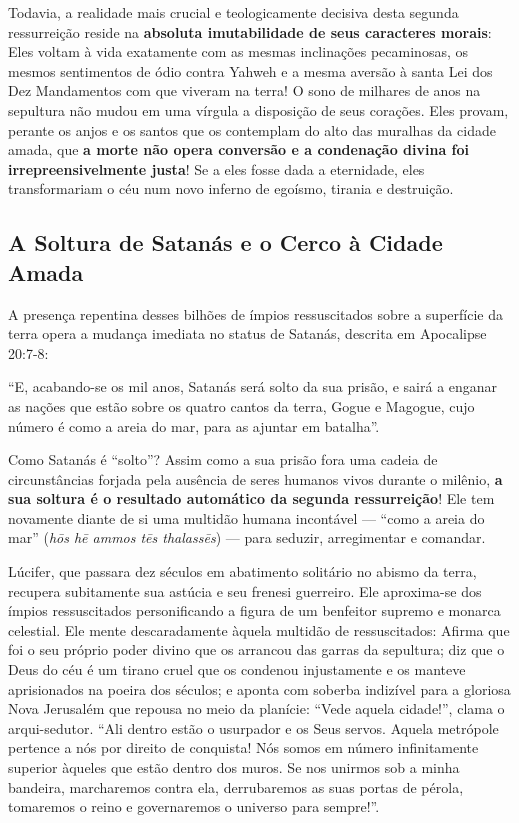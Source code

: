 \documentclass[11pt,a4paper,openany]{book}
\begin{document}
Todavia, a realidade mais crucial e teologicamente decisiva desta segunda ressurreição reside na \textbf{absoluta imutabilidade de seus caracteres morais}:
Eles voltam à vida exatamente com as mesmas inclinações pecaminosas, os mesmos sentimentos de ódio contra Yahweh e a mesma aversão à santa Lei dos Dez Mandamentos com que viveram na terra!
O sono de milhares de anos na sepultura não mudou em uma vírgula a disposição de seus corações. Eles provam, perante os anjos e os santos que os contemplam do alto das muralhas da cidade amada, que \textbf{a morte não opera conversão e a condenação divina foi irrepreensivelmente justa}! Se a eles fosse dada a eternidade, eles transformariam o céu num novo inferno de egoísmo, tirania e destruição.



\subsection{A Soltura de Satanás e o Cerco à Cidade Amada}


A presença repentina desses bilhões de ímpios ressuscitados sobre a superfície da terra opera a mudança imediata no status de Satanás, descrita em Apocalipse 20:7-8:

``E, acabando-se os mil anos, Satanás será solto da sua prisão, e sairá a enganar as nações que estão sobre os quatro cantos da terra, Gogue e Magogue, cujo número é como a areia do mar, para as ajuntar em batalha''.

Como Satanás é ``solto''?
Assim como a sua prisão fora uma cadeia de circunstâncias forjada pela ausência de seres humanos vivos durante o milênio, \textbf{a sua soltura é o resultado automático da segunda ressurreição}! Ele tem novamente diante de si uma multidão humana incontável — ``como a areia do mar'' (\textit{hōs hē ammos tēs thalassēs}) — para seduzir, arregimentar e comandar.

Lúcifer, que passara dez séculos em abatimento solitário no abismo da terra, recupera subitamente sua astúcia e seu frenesi guerreiro. Ele aproxima-se dos ímpios ressuscitados personificando a figura de um benfeitor supremo e monarca celestial. Ele mente descaradamente àquela multidão de ressuscitados:
Afirma que foi o seu próprio poder divino que os arrancou das garras da sepultura; diz que o Deus do céu é um tirano cruel que os condenou injustamente e os manteve aprisionados na poeira dos séculos; e aponta com soberba indizível para a gloriosa Nova Jerusalém que repousa no meio da planície:
``Vede aquela cidade!'', clama o arqui-sedutor. ``Ali dentro estão o usurpador e os Seus servos. Aquela metrópole pertence a nós por direito de conquista! Nós somos em número infinitamente superior àqueles que estão dentro dos muros. Se nos unirmos sob a minha bandeira, marcharemos contra ela, derrubaremos as suas portas de pérola, tomaremos o reino e governaremos o universo para sempre!''.
\end{document}
